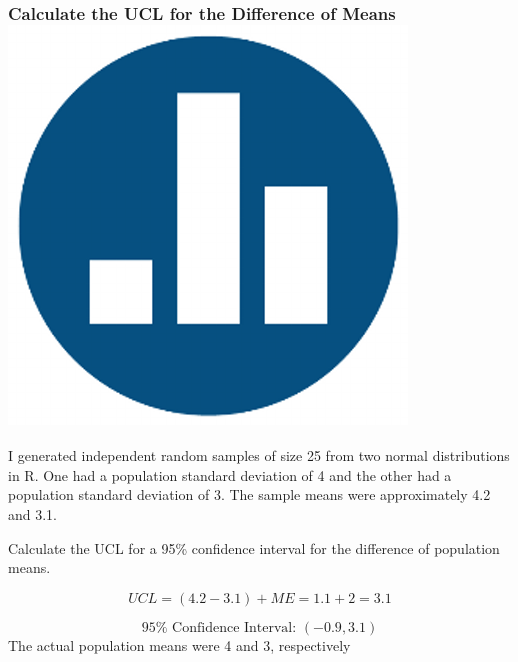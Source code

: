 \begin{frame}
\frametitle{Calculate the UCL for the Difference of Means \hfill \includegraphics[scale = 0.05]{./images/clicker}}
I generated independent random samples of size 25 from two normal distributions in R. One had a population standard deviation of 4 and the other had a population standard deviation of 3. The sample means were approximately 4.2 and 3.1.

\vspace{1em}
\alert{Calculate the UCL for a 95\% confidence interval for the difference of population means.}\pause

$$UCL = (4.2 - 3.1) + ME =1.1 + 2 = 3.1$$

\pause

\alert{$$\boxed{95\% \mbox{ Confidence Interval: } (-0.9, 3.1)}$$} \pause
The actual population means were 4 and 3, respectively
\end{frame}


